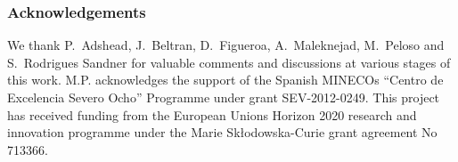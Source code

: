 \documentclass[11pt,a4paper]{article}
\begin{document}
\setcounter{page}{2}

\tableofcontents
\newpage









\vspace{1cm}
\subsubsection*{Acknowledgements}

We thank P.~Adshead, J.~Beltran, D.~Figueroa, A.~Maleknejad, M.~Peloso and S.~Rodrigues Sandner for valuable comments and discussions at various stages of this work. M.P. acknowledges the support of the Spanish MINECOs ``Centro de Excelencia Severo Ocho'' Programme under grant SEV-2012-0249. This project has received funding from the European Unions Horizon 2020 research and innovation programme under the Marie Sk\l{}odowska-Curie grant agreement No 713366.

\newpage
\appendix
{}








{}
\end{document}
